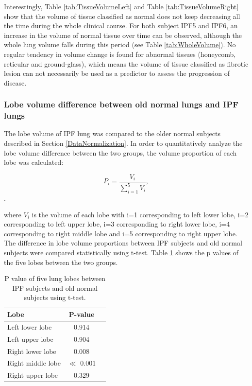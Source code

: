 Interestingly, Table \ref{tab:TissueVolumeLeft} and Table \ref{tab:TissueVolumeRight} show that the volume of tissue classified as normal does not keep decreasing all the time during the whole clinical course. For both subject IPF5 and IPF6, an increase in the volume of normal tissue over time can be observed, although the whole lung volume falls during this period (see Table \ref{tab:WholeVolume}). No regular tendency in volume change is found for abnormal tissues (honeycomb, reticular and ground-glass), which means the volume of tissue classified as fibrotic lesion can not necessarily be used as a predictor to assess the progression of disease.

\subsubsection{Lobe volume difference between old normal lungs and IPF lungs}
The lobe volume of IPF lung was compared to the older normal subjects described in Section \ref{DataNormalization}. In order to quantitatively analyze the lobe volume difference between the two groups, the volume proportion of each lobe was calculated:

\begin{equation}
 \label{eq:FissurePrediction1}
 P_{i} = \frac{V_{i}}{\sum_{i=1}^{5}V_i},
\end{equation}. 

\noindent where $V_{i}$ is the volume of each lobe with i=1 corresponding to left lower lobe, i=2 corresponding to left upper lobe, i=3 corresponding to right lower lobe, i=4 corresponding to right middle lobe and i=5 corresponding to right upper lobe. The difference in lobe volume proportions between IPF subjects and old normal subjects were compared statistically using t-test. Table \ref{tab:LobeVolumeAnalysis} shows the p values of the five lobes between the two groups.

\begin{table}[htbp]
\centering
\caption{P value of five lung lobes between IPF subjects and old normal subjects using t-test.}
\label{tab:LobeVolumeAnalysis}
\begin{tabular}{|l | c | c}
\hline
\bf{Lobe} & \bf{P-value} \\
\hline
Left lower lobe & 0.914 \\
\hline
Left upper lobe	& 0.904 \\
\hline
Right lower lobe	& 0.008 \\
\hline
Right middle lobe	& $\ll$ 0.001 \\
\hline
Right upper lobe	& 0.329 \\
\hline
\end{tabular}
\end{table}

